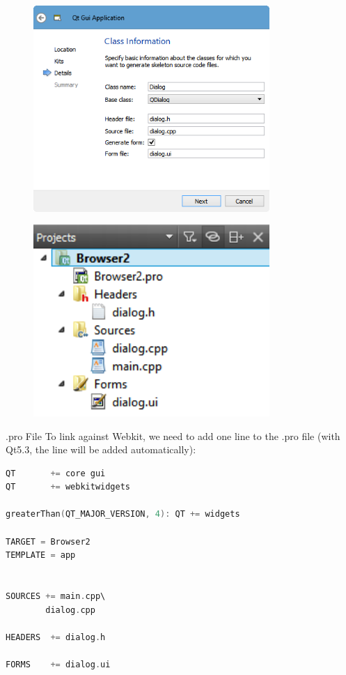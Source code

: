 \begin{figure}[htbp]
\centering
\includegraphics[width=0.8\textwidth]{images/QDialog.png}
\caption{}
\end{figure}

\begin{figure}[htbp]
\centering
\includegraphics[width=0.8\textwidth]{images/Browser2_Files.png}
\caption{}
\end{figure}

.pro File To link against Webkit, we need to add one line to the .pro
file (with Qt5.3, the line will be added automatically):

\begin{lstlisting}[language=c++]
QT       += core gui
QT       += webkitwidgets

greaterThan(QT_MAJOR_VERSION, 4): QT += widgets

TARGET = Browser2
TEMPLATE = app


SOURCES += main.cpp\
        dialog.cpp

HEADERS  += dialog.h

FORMS    += dialog.ui
\end{lstlisting}


